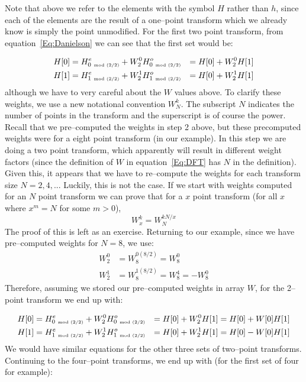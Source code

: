 \documentclass[10pt]{article}
\begin{document}
Note that above we refer to the elements with the symbol $H$ rather than
$h$, since each of the elements are the result of a one--point transform
which we already know is simply the point unmodified.
For the first two point transform, from equation~\ref{Eq:Danielson} we can
see that the first set would be:

\begin{equation}
\begin{aligned}
H[0] & = H_{0\ \mbox{\tiny mod\ (2/2)}}^e + W_2^0 H_{0\ \mbox{\tiny mod\ (2/2)}}^o 
     & = H[0] + W_2^0H[1] \\
H[1] & = H_{1\ \mbox{\tiny mod\ (2/2)}}^e + W_2^1 H_{1\ \mbox{\tiny mod\ (2/2)}}^o 
     & = H[0] + W_2^1H[1]
\end{aligned}
\end{equation}
although we have to very careful about the $W$ values above.
To clarify these weights, we use  a new notational convention
$W_N^k$.  The subscript $N$ indicates the number of points in
the transform and the superscript is of course the power.
Recall that
we pre--computed the weights in step 2 above, but these precomputed
weights were for a eight point transform (in our example).
In this step we are doing a 
two point transform, which apparently  will result in different
weight factors (since the definition of $W$ in equation~\ref{Eq:DFT}
has $N$ in the definition).
Given this, it appears that
we have to re--compute the weights for each transform size $N = 2, 4, ..$.
Luckily, this is not the case.  If we start with weights computed
for an $N$ point transform
we can prove that for a $x$ point transform (for all $x$ where
$x^m = N$ for some $m > 0$),
\begin{equation}
\label{Eq:WScaling}
W_x^k = W_N^{kN/x}        
\end{equation}
The proof of this is left as
an exercise. Returning to our example, since we have pre--computed
weights for $N=8$, we use:
\begin{equation}
\begin{aligned}
 W_2^0 & = W_{8}^{0(8/2)} = W_{8}^0\\
 W_2^1 & = W_{8}^{1(8/2)} = W_{8}^4 = -W_{8}^0
\end{aligned}
\end{equation}
Therefore, assuming we stored our pre--computed weights in array $W$, 
for the 2--point transform we end up with:

\begin{equation}
\begin{aligned}
H[0] & = H_{0\ \mbox{\tiny mod\ (2/2)}}^e + W_2^0 H_{0\ \mbox{\tiny mod\ (2/2)}}^o 
     & = H[0] + W_2^0H[1] & = H[0] + W[0]H[1] \\
H[1] & = H_{1\ \mbox{\tiny mod\ (2/2)}}^e + W_2^1 H_{1\ \mbox{\tiny mod\ (2/2)}}^o 
     & = H[0] + W_2^1H[1] & = H[0] - W[0]H[1]
\end{aligned}
\end{equation}
We would have similar equations for the other three sets of two--point
transforms.  Continuing to the four--point transforms, we end up with
(for the first set of four for example):
\end{document}
